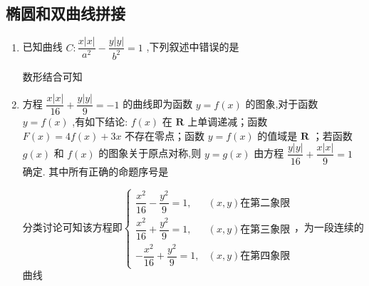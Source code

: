 \subsection*{椭圆和双曲线拼接}
\begin{enumerate}
    \item 已知曲线 $C : \dfrac{x\left| x\right| }{{a}^{2}} - \dfrac{y\left| y\right| }{{b}^{2}} = 1$ ,下列叙述中错误的是
    \begin{jieda}
        数形结合可知
    \end{jieda}
    \item 方程 $\dfrac{x\left| x\right| }{16} + \dfrac{y\left| y\right| }{9} =  - 1$ 的曲线即为函数 $y = f\left( x\right)$ 的图象,对于函数 $y = f\left( x\right)$ ,有如下结论: $f\left( x\right)$ 在 $\mathbf{R}$ 上单调递减；函数 $F\left( x\right)  = {4f}\left( x\right)  + {3x}$ 不存在零点；函数 $y = f\left( x\right)$ 的值域是 $\mathbf{R}$ ；若函数 $g\left( x\right)$ 和 $f\left( x\right)$ 的图象关于原点对称,则 $y = g\left( x\right)$ 由方程 $\dfrac{y\left| y\right| }{16} + \dfrac{x\left| x\right| }{9} = 1$ 确定. 其中所有正确的命题序号是

    \begin{jieda}
        分类讨论可知该方程即$\left\{\begin{array}{ll}
                \dfrac{x^2}{16}-\dfrac{y^2}{9} = 1, & (x, y)\text{在第二象限}  \\
                \dfrac{x^2}{16}+\dfrac{y^2}{9} = 1, & (x, y)\text{在第三象限}  \\
                -\dfrac{x^2}{16}+\dfrac{y^2}{9} = 1, & (x, y)\text{在第四象限}
        \end{array}\right.$，为一段连续的曲线
    \end{jieda}
\end{enumerate}
